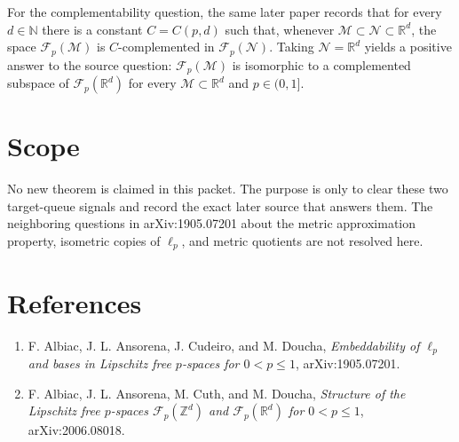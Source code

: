 \documentclass[11pt]{article}
\newcommand{\Fp}{\mathcal F_p}
\newcommand{\R}{\mathbb R}
\newcommand{\N}{\mathbb N}
\begin{document}
For the complementability question, the same later paper records that for every
$d\in\N$ there is a constant $C=C(p,d)$ such that, whenever
$\mathcal M\subset \mathcal N\subset \R^d$, the space $\Fp(\mathcal M)$ is
$C$-complemented in $\Fp(\mathcal N)$. Taking $\mathcal N=\R^d$ yields a
positive answer to the source question: $\Fp(\mathcal M)$ is isomorphic to a
complemented subspace of $\Fp(\R^d)$ for every $\mathcal M\subset\R^d$ and
$p\in(0,1]$.

\section*{Scope}

No new theorem is claimed in this packet. The purpose is only to clear these
two target-queue signals and record the exact later source that answers them.
The neighboring questions in arXiv:1905.07201 about the metric approximation
property, isometric copies of $\ell_p$, and metric quotients are not resolved
here.

\section*{References}

\begin{enumerate}
\item F. Albiac, J. L. Ansorena, J. Cudeiro, and M. Doucha,
\emph{Embeddability of $\ell_p$ and bases in Lipschitz free $p$-spaces for
$0<p\leq 1$}, arXiv:1905.07201.
\item F. Albiac, J. L. Ansorena, M. Cuth, and M. Doucha,
\emph{Structure of the Lipschitz free $p$-spaces $\mathcal F_p(\mathbb Z^d)$
and $\mathcal F_p(\mathbb R^d)$ for $0<p\leq 1$}, arXiv:2006.08018.
\end{enumerate}
\end{document}
